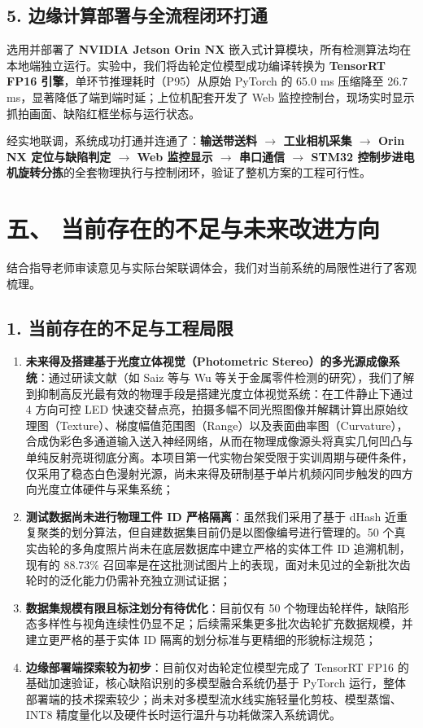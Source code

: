 \subsection*{5. 边缘计算部署与全流程闭环打通}
选用并部署了 \textbf{NVIDIA Jetson Orin NX} 嵌入式计算模块，所有检测算法均在本地端独立运行。实验中，我们将齿轮定位模型成功编译转换为 \textbf{TensorRT FP16 引擎}，单环节推理耗时（P95）从原始 PyTorch 的 65.0 ms 压缩降至 26.7 ms，显著降低了端到端时延；上位机配套开发了 Web 监控控制台，现场实时显示抓拍画面、缺陷红框坐标与运行状态。

经实地联调，系统成功打通并连通了：\textbf{输送带送料 $\rightarrow$ 工业相机采集 $\rightarrow$ Orin NX 定位与缺陷判定 $\rightarrow$ Web 监控显示 $\rightarrow$ 串口通信 $\rightarrow$ STM32 控制步进电机旋转分拣}的全套物理执行与控制闭环，验证了整机方案的工程可行性。

\section*{五、 当前存在的不足与未来改进方向}

结合指导老师审读意见与实际台架联调体会，我们对当前系统的局限性进行了客观梳理。

\subsection*{1. 当前存在的不足与工程局限}
\begin{enumerate}
    \item \textbf{未来得及搭建基于光度立体视觉（Photometric Stereo）的多光源成像系统}：通过研读文献（如 Saiz 等与 Wu 等关于金属零件检测的研究），我们了解到抑制高反光最有效的物理手段是搭建光度立体视觉系统：在工件静止下通过 4 方向可控 LED 快速交替点亮，拍摄多幅不同光照图像并解耦计算出原始纹理图（Texture）、梯度幅值范围图（Range）以及表面曲率图（Curvature），合成伪彩色多通道输入送入神经网络，从而在物理成像源头将真实几何凹凸与单纯反射亮斑彻底分离。本项目第一代实物台架受限于实训周期与硬件条件，仅采用了稳态白色漫射光源，尚未来得及研制基于单片机频闪同步触发的四方向光度立体硬件与采集系统；
    \item \textbf{测试数据尚未进行物理工件 ID 严格隔离}：虽然我们采用了基于 dHash 近重复聚类的划分算法，但自建数据集目前仍是以图像编号进行管理的。50 个真实齿轮的多角度照片尚未在底层数据库中建立严格的实体工件 ID 追溯机制，现有的 88.73\% 召回率是在这批测试图片上的表现，面对未见过的全新批次齿轮时的泛化能力仍需补充独立测试证据；
    \item \textbf{数据集规模有限且标注划分有待优化}：目前仅有 50 个物理齿轮样件，缺陷形态多样性与视角连续性仍显不足；后续需采集更多批次齿轮扩充数据规模，并建立更严格的基于实体 ID 隔离的划分标准与更精细的形貌标注规范；
    \item \textbf{边缘部署端探索较为初步}：目前仅对齿轮定位模型完成了 TensorRT FP16 的基础加速验证，核心缺陷识别的多模型融合系统仍基于 PyTorch 运行，整体部署端的技术探索较少；尚未对多模型流水线实施轻量化剪枝、模型蒸馏、INT8 精度量化以及硬件长时运行温升与功耗做深入系统调优。
\end{enumerate}

